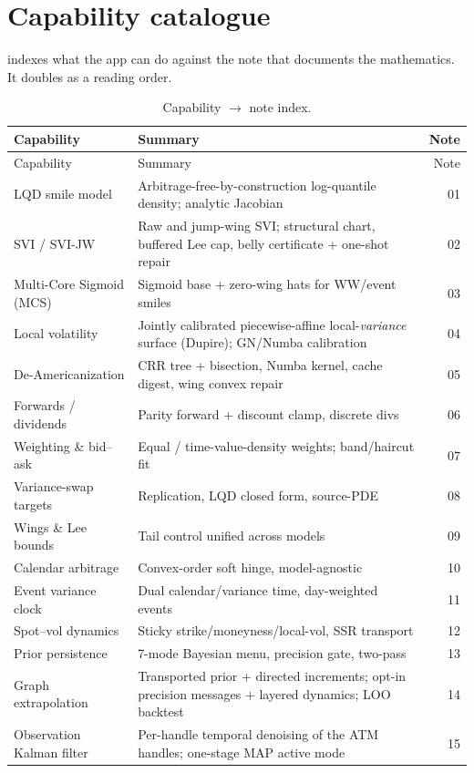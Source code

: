 \documentclass[11pt]{article}
\begin{document}
\section{Capability catalogue}
\label{sec:capabilities}

 indexes what the app can do against the note that documents the
mathematics. It doubles as a reading order.

\begin{longtable}{p{}p{}r}
\caption{Capability $\to$ note index.}\label{tab:caps}\\
\toprule
Capability & Summary & Note\\
\midrule
\endfirsthead
\toprule Capability & Summary & Note\\ \midrule
\endhead
LQD smile model & Arbitrage-free-by-construction log-quantile density;
analytic Jacobian & 01\\
SVI / SVI-JW & Raw and jump-wing SVI; structural chart, buffered Lee cap,
belly certificate + one-shot repair & 02\\
Multi-Core Sigmoid (MCS) & Sigmoid base + zero-wing hats for WW/event smiles & 03\\
Local volatility & Jointly calibrated piecewise-affine local-\emph{variance}
surface (Dupire); GN/Numba calibration & 04\\
De-Americanization & CRR tree + bisection, Numba kernel, cache digest, wing convex repair & 05\\
Forwards / dividends & Parity forward + discount clamp, discrete divs & 06\\
Weighting \& bid--ask & Equal / time-value-density weights; band/haircut fit & 07\\
Variance-swap targets & Replication, LQD closed form, source-PDE & 08\\
Wings \& Lee bounds & Tail control unified across models & 09\\
Calendar arbitrage & Convex-order soft hinge, model-agnostic & 10\\
Event variance clock & Dual calendar/variance time, day-weighted events & 11\\
Spot--vol dynamics & Sticky strike/moneyness/local-vol, SSR transport & 12\\
Prior persistence & 7-mode Bayesian menu, precision gate, two-pass & 13\\
Graph extrapolation & Transported prior + directed increments; opt-in
precision messages + layered dynamics; LOO backtest & 14\\
Observation Kalman filter & Per-handle temporal denoising of the ATM handles;
one-stage MAP active mode & 15\\
\bottomrule
\end{longtable}
\end{document}
